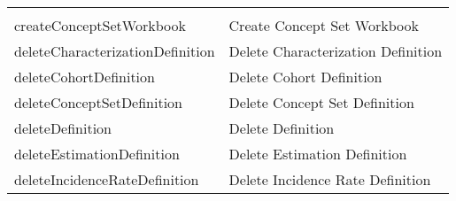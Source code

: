 \documentclass[
]{article}
\begin{document}
\begin{longtable}[]{@{}ll@{}}
\begin{minipage}[t]{0.48\columnwidth}
\end{minipage}\tabularnewline
\begin{minipage}[t]{0.46\columnwidth}\raggedright
createConceptSetWorkbook\strut
\end{minipage} & \begin{minipage}[t]{0.48\columnwidth}\raggedright
Create Concept Set Workbook\strut
\end{minipage}\tabularnewline
\begin{minipage}[t]{0.46\columnwidth}\raggedright
deleteCharacterizationDefinition\strut
\end{minipage} & \begin{minipage}[t]{0.48\columnwidth}\raggedright
Delete Characterization Definition\strut
\end{minipage}\tabularnewline
\begin{minipage}[t]{0.46\columnwidth}\raggedright
deleteCohortDefinition\strut
\end{minipage} & \begin{minipage}[t]{0.48\columnwidth}\raggedright
Delete Cohort Definition\strut
\end{minipage}\tabularnewline
\begin{minipage}[t]{0.46\columnwidth}\raggedright
deleteConceptSetDefinition\strut
\end{minipage} & \begin{minipage}[t]{0.48\columnwidth}\raggedright
Delete Concept Set Definition\strut
\end{minipage}\tabularnewline
\begin{minipage}[t]{0.46\columnwidth}\raggedright
deleteDefinition\strut
\end{minipage} & \begin{minipage}[t]{0.48\columnwidth}\raggedright
Delete Definition\strut
\end{minipage}\tabularnewline
\begin{minipage}[t]{0.46\columnwidth}\raggedright
deleteEstimationDefinition\strut
\end{minipage} & \begin{minipage}[t]{0.48\columnwidth}\raggedright
Delete Estimation Definition\strut
\end{minipage}\tabularnewline
\begin{minipage}[t]{0.46\columnwidth}\raggedright
deleteIncidenceRateDefinition\strut
\end{minipage} & \begin{minipage}[t]{0.48\columnwidth}\raggedright
Delete Incidence Rate Definition\strut

\end{minipage}
\end{longtable}
\end{document}
